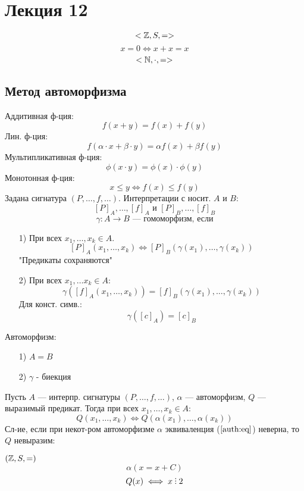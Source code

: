 \section{Лекция 12}
\[
<\mathbb{Z}, S, = >
\]
\[
x = 0 \iff x + x = x
\]
\[
<\mathbb{N}, \cdot, = >
\]
\subsection{Метод автоморфизма}
Аддитивная ф-ция:
\[
f(x + y) = f(x) + f(y)
\]
Лин. ф-ция:
\[
f(\alpha \cdot x + \beta \cdot y) = \alpha f(x) + \beta f(y)
\]
Мультипликативная ф-ция:
\[
  \phi(x \cdot y) = \phi(x) \cdot \phi(y)
\]
Монотонная ф-ция:
\[
x \leq y \iff f(x) \leq f(y)
\]
Задана сигнатура $(P, \ldots, f, \ldots)$. Интерпретации с носит. $A$ и $B$:
\[
[P]_A, \ldots, [f]_A \text{ и } [P]_B, \ldots, [f]_B
\]
\[
\gamma \colon A \rightarrow B \text{ --- гомоморфизм, если}
\]
\begin{itemize}
  \item [1) ] При всех $x_1, \ldots, x_k \in A$.
    \[
    [P]_A (x_1, \ldots, x_k) \iff [P]_B (\gamma(x_1), \ldots, \gamma(x_k))
    \]
    "Предикаты сохраняются"
  \item [2) ] При всех $x_1, \ldots x_k \in A$:
    \[
    \gamma([f]_A(x_1, \ldots, x_k)) = [f]_B(\gamma(x_1), \ldots, \gamma(x_k))
    \]
     Для конст. симв.:
     \[
     \gamma([c]_A) = [c]_B
     \]
\end{itemize}
\begin{definition}
Автоморфизм:
\begin{itemize}
  \item [1) ] $A = B$
  \item [2) ] $\gamma$ - биекция
\end{itemize}
\end{definition}
\begin{theorem}[Об автоморфизмах]
\label{th:automorphism}
Пусть $A$ --- интерпр. сигнатуры $(P, \ldots, f, \ldots)$, $\alpha$ --- автоморфизм, $Q$ --- выразимый предикат. Тогда при всех $x_1, \ldots, x_k \in A$:
\begin{equation}
  \label{auth:eq}
Q(x_1, \ldots, x_k) \iff Q(\alpha(x_1), \ldots, \alpha(x_k))
\end{equation}
Сл-ие, если при некот-ром автоморфизме $\alpha$ эквиваленция ($\ref{auth:eq}$) неверна, то $Q$ невыразим:
\end{theorem}
\begin{example}
$(\mathbb{Z}, S, =)$
\[
\alpha(x = x + C)
\]
\[
Q(x) \iff x \divby 2
\]
\end{example}
